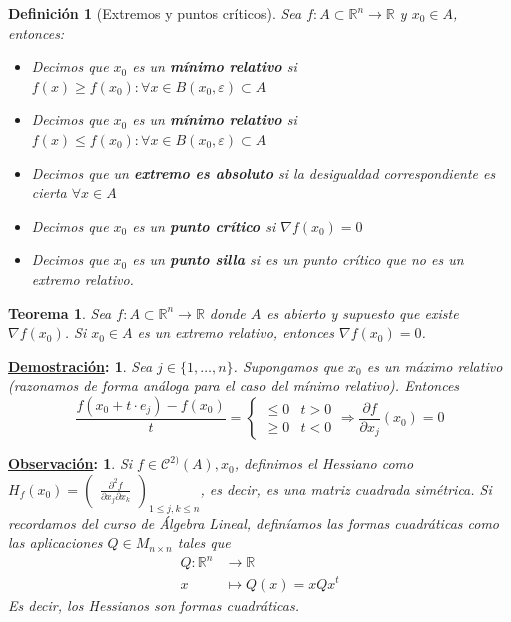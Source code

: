 \documentclass[10pt,a4paper,openright]{book}
\theoremstyle{break}
\newtheorem*{defi}{Definición}
\newtheorem*{theo}{Teorema}
\newtheorem*{demo}{\underline{Demostración}:}
\newtheorem*{obs}{\underline{Observación}:}
\begin{document}
\begin{defi}[Extremos y puntos críticos]
Sea $f: A \subset \mathbb{R}^n \to  \mathbb{R}$ y $x_0 \in A$, entonces:
\begin{itemize}
\item Decimos que $x_0$ es un \textbf{mínimo relativo} si $f(x) \geq f(x_0) : \forall x \in B(x_0, \varepsilon) \subset A$
\item Decimos que $x_0$ es un \textbf{mínimo relativo} si $f(x) \leq f(x_0) : \forall x \in B(x_0, \varepsilon) \subset A$
\item Decimos que un \textbf{extremo es absoluto} si la desigualdad correspondiente es cierta $\forall x \in A$
\item Decimos que $x_0$ es un \textbf{punto crítico} si $\nabla f(x_0) = 0$
\item Decimos que $x_0$ es un \textbf{punto silla} si es un punto crítico que no es un extremo relativo.
\end{itemize}
\end{defi}

\begin{theo}
Sea $f: A \subset \mathbb{R}^n \to \mathbb{R}$ donde $A$ es abierto y supuesto que existe $\nabla f(x_0)$. Si $x_0 \in A$ es un extremo relativo, entonces $\nabla f (x_0) = 0$.
\end{theo}

\begin{demo}
Sea $j \in \{1, \ldots, n\}$. Supongamos que $x_0$ es un máximo relativo (razonamos de forma análoga para el caso del mínimo relativo). Entonces
$$\frac{f(x_0 + t \cdot e_j) - f(x_0)}{t} = \begin{cases} \leq 0 & t> 0 \\ \geq 0 & t < 0 \end{cases}\Rightarrow \frac{\partial f}{\partial x_j} (x_0) = 0$$
\end{demo}

\begin{obs}
Si $f \in \mathcal{C}^{2)}(A), x_0$, definimos el Hessiano como $ H_f (x_0) = \begin{pmatrix}
\frac{\partial^2 f}{\partial x_j \partial x_k}
\end{pmatrix}_{1 \leq j,k \leq n}$, es decir, es una matriz cuadrada simétrica. Si recordamos del curso de Álgebra Lineal, definíamos las formas cuadráticas como las aplicaciones $Q \in M_{n \times n}$ tales que
\begin{align*}
Q: \mathbb{R}^n &\to \mathbb{R} \\ x &\mapsto Q(x) = x Q x^t
\end{align*}
Es decir, los Hessianos son formas cuadráticas.
\end{obs}
\end{document}
